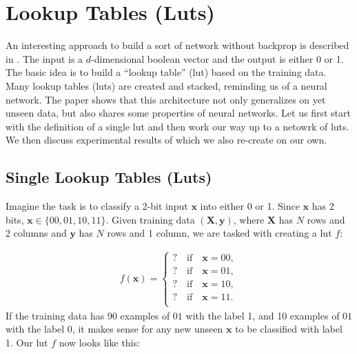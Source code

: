 \section{Lookup Tables (Luts)}
An interesting approach to build a sort of network without backprop is described in \cite{chatterjee2018learning}. The input is a $d$-dimensional boolean vector and the output is either 0 or 1. The basic idea is to build a \enquote{lookup table} (lut) based on the training data. Many lookup tables (luts) are created and stacked, reminding us of a neural network. The paper shows that this architecture not only generalizes on yet unseen data, but also shares some properties of neural networks. Let us first start with the definition of a single lut and then work our way up to a netowrk of luts. We then discuss experimental results of \cite{chatterjee2018learning} which we also re-create on our own.

\subsection{Single Lookup Tables (Luts)}
Imagine the task is to classify a 2-bit input $\bm{x}$ into either 0 or 1. Since $\bm{x}$ has 2 bits, $\bm{x} \in \{00, 01, 10, 11 \}$. Given training data $(\bm{X}, \bm{y})$, where $\bm{X}$ has $N$ rows and 2 columns and $\bm{y}$ has $N$ rows and 1 column, we are tasked with creating a lut $f$:

\begin{align}
    f(\bm{x}) = \begin{cases}
        ? \quad \text{if} \quad \bm{x} = 00, \\
        ? \quad \text{if} \quad \bm{x} = 01, \\
        ? \quad \text{if} \quad \bm{x} = 10, \\
        ? \quad \text{if} \quad \bm{x} = 11. \\
    \end{cases}
\end{align} If the training data has 90 examples of $01$ with the label 1, and 10 examples of $01$ with the label 0, it makes sense for any new unseen $\bm{x}$ to be classified with label 1. Our lut $f$ now looks like this:

